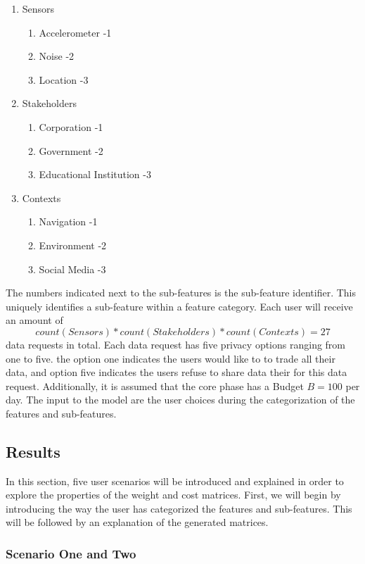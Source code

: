 \begin{enumerate}
    \item Sensors
    \begin{enumerate}
    \item Accelerometer -1
    \item Noise -2
    \item Location -3
   \end{enumerate}
    \item Stakeholders 
    \begin{enumerate}
    \item Corporation -1
    \item Government -2
    \item Educational Institution -3
   \end{enumerate}
   \item Contexts
    \begin{enumerate}
    \item Navigation -1
    \item Environment -2
    \item Social Media -3
   \end{enumerate}
 \end{enumerate}
 
The numbers indicated next to the sub-features is the sub-feature identifier. This uniquely identifies a sub-feature within a feature category.
Each user will receive an amount of $$count(Sensors)*count(Stakeholders)*count(Contexts)=27$$ data requests in total. Each data request has five privacy options ranging from one to five. the option one indicates the users would like to to trade all their data, and option five indicates the users refuse to share data their for this data request. Additionally, it is assumed that the core phase has a Budget $B=100$ per day. 
The input to the model are the user choices during the categorization of the features and sub-features.

\subsection{Results}

In this section, five user scenarios will be introduced and explained in order to explore the properties of the weight and cost matrices.
First, we will begin by introducing the way the user has categorized the features and sub-features. This will be followed by an explanation
of the generated matrices.

\subsubsection{Scenario One and Two}

